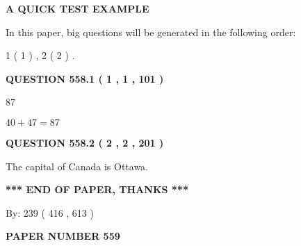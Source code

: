 \documentclass[12pt]{article}
\begin{document}
   
   
   
 \vspace{0.2in}
{\LARGE {\textbf{ A QUICK TEST EXAMPLE}}}
   
   
   
\vspace{0.2in}
   
In this paper, big questions will be generated in the following order: 
   
   
   1 ( 1 )
 ,
   2 ( 2 )
 .
  
\vspace{0.2in}
  
{\textbf{\Large{QUESTION
558.1 
 ( 1 , 1 , 101 )
}}}
  
  
 
 
\noindent{}

87
 
 
 
 
\noindent{}

$ %
40 +  %
47=   %
87$
 
 
  
\vspace{0.2in}
  
{\textbf{\Large{QUESTION
558.2 
 ( 2 , 2 , 201 )
}}}
  
  
 
 
\noindent{}
 
 
The capital of Canada is Ottawa.
 
 
 
 
   
   
 \vspace{0.2in}
 
   
   
   
   
\vspace{1.0in} 
{\textbf{\large{ *** END OF PAPER, THANKS *** }}} 
   
   
\hspace{1.0in} By: 
 239 ( 416 ,  613 )
   
   
   
   
\newpage 
\setcounter{page}{ 
   559001 } 
   
   
   
   
 {\textbf{ \Large{ PAPER NUMBER  559  }}}
   
\end{document}
